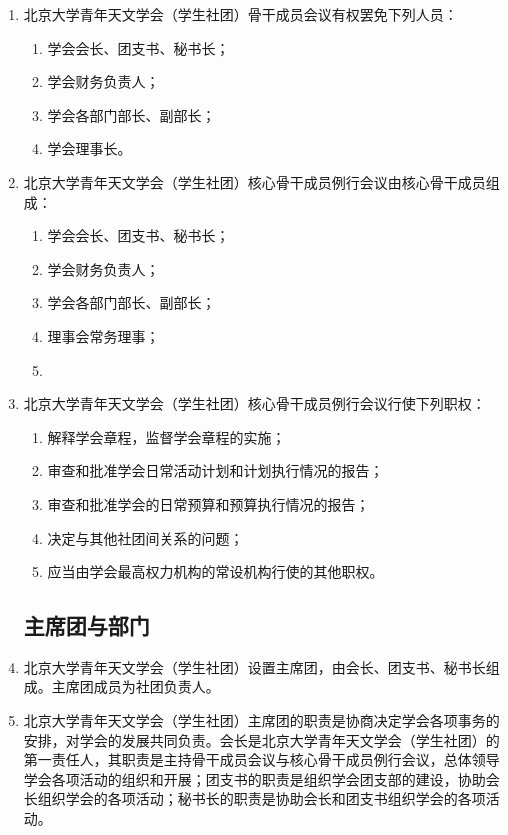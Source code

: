 \begin{enumerate}[resume]
    \item 北京大学青年天文学会（学生社团）骨干成员会议有权罢免下列人员：
    
    \begin{enumerate}
        \item 学会会长、团支书、秘书长；
        \item 学会财务负责人；
        \item 学会各部门部长、副部长；
        \item 学会理事长。
    \end{enumerate}

    \item 北京大学青年天文学会（学生社团）核心骨干成员例行会议由核心骨干成员组成：
    
    \begin{enumerate}
        \item 学会会长、团支书、秘书长；
        \item 学会财务负责人；
        \item 学会各部门部长、副部长；
        \item 理事会常务理事；
        \item 
    \end{enumerate}

    \item 北京大学青年天文学会（学生社团）核心骨干成员例行会议行使下列职权：
    
    \begin{enumerate}
        \item 解释学会章程，监督学会章程的实施；
        \item 审查和批准学会日常活动计划和计划执行情况的报告；
        \item 审查和批准学会的日常预算和预算执行情况的报告；
        \item 决定与其他社团间关系的问题；
        \item 应当由学会最高权力机构的常设机构行使的其他职权。
    \end{enumerate}
    
    \subsection{主席团与部门}
    
    \item 北京大学青年天文学会（学生社团）设置主席团，由会长、团支书、秘书长组成。主席团成员为社团负责人。
    
    \item 北京大学青年天文学会（学生社团）主席团的职责是协商决定学会各项事务的安排，对学会的发展共同负责。会长是北京大学青年天文学会（学生社团）的第一责任人，其职责是主持骨干成员会议与核心骨干成员例行会议，总体领导学会各项活动的组织和开展；团支书的职责是组织学会团支部的建设，协助会长组织学会的各项活动；秘书长的职责是协助会长和团支书组织学会的各项活动。
    

\end{enumerate}
